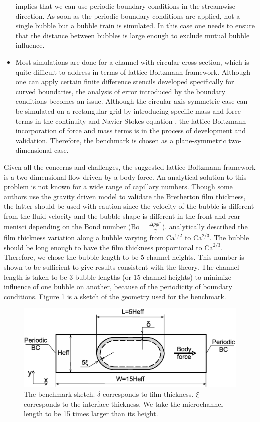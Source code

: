 \documentclass[preprint,12pt]{elsarticle}
\newcommand{\Ca}{\mathrm{Ca}}
\begin{document}
\begin{itemize}
implies that we can use periodic boundary conditions in the streamwise direction. As soon as the
periodic boundary
conditions are applied, not a single bubble but a bubble train is simulated. In this case one
needs
to ensure that the distance between bubbles is large enough to exclude mutual bubble influence.
 \item Most simulations are done for a channel with circular cross section,
which is quite difficult to address in terms of lattice Boltzmann framework.
Although one can apply certain finite difference stencils
\cite{arnold-boundary,hunt-boundary} developed specifically for curved boundaries,
the analysis of error introduced by the boundary conditions becomes an issue. Although the circular
axis-symmetric case can be simulated on a rectangular grid by introducing specific mass and force
terms in the continuity and Navier-Stokes equation \cite{halliday-circular}, the lattice Boltzmann
incorporation of force and mass terms is in the process of development and validation. Therefore,
the benchmark is chosen as a plane-symmetric two-dimensional case.  
\end{itemize}
Given all the concerns and challenges, the suggested lattice Boltzmann framework
is a two-dimensional flow driven by a body force.  An analytical
solution to this problem is not known for a wide range of capillary
numbers.
Though some authors \cite{sehgal-microchannel} use the gravity driven model to
validate the Bretherton film thickness, the latter should be used with caution
since the velocity of the bubble is different from the fluid velocity and the
bubble shape
is different in the front and rear menisci depending on the Bond number ($\mathrm{Bo}=\frac{\Delta
\rho g
l^2}{\gamma}$). \citet{wong-films}
analytically described the film thickness variation along a bubble varying from $\Ca^{1/2}$ to
$\Ca^{2/3}$. The bubble should be long enough to have the film thickness proportional to
$\Ca^{2/3}$. Therefore, we chose the bubble length to be $5$ channel heights. This number is shown
to be sufficient to give results consistent with the theory. The
channel length is taken to be $3$ bubble lengths (or $15$ channel heights)
to minimize influence of one bubble on another,
because of the periodicity of boundary conditions.
Figure \ref{fig:benchmark:sketch} is a sketch of the geometry
used for the benchmark.
\begin{figure}
\includegraphics[width=\textwidth]{Figures/benchmark_new.eps}
\caption{The benchmark sketch. $\delta$ corresponds to film thickness. $\xi$ corresponds to the interface thickness. We take the microchannel length to be 15 times larger than its height.
\label{fig:benchmark:sketch}}
\end{figure}
\end{document}
